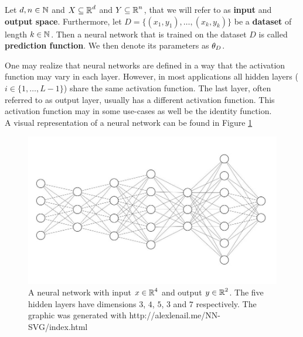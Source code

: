 \begin{definition}
Let $d, n \in \operatorname{\mathbb{N}}$ and $X\subseteq \operatorname{\mathbb{R}}^d$ and $Y \subseteq \operatorname{\mathbb{R}}^n$, that we will refer to as \textbf{input} and \textbf{output space}. Furthermore, let $D=\{(x_1,y_1),\ldots, (x_k,y_k)\}$ be a \textbf{dataset} of length $k\in\operatorname{\mathbb{N}}$. Then a neural network that is trained on the dataset $D$ is called \textbf{prediction function}. We then denote its parameters as $\theta_{D}$.
\end{definition}

One may realize that neural networks are defined in a way that the activation function may vary in each layer. However, in most applications all hidden layers ($i \in \{1, \ldots, L-1\}$) share the same activation function. The last layer, often referred to as output layer, usually has a different activation function. This activation function may in some use-cases as well be the identity function.\\
A visual representation of a neural network can be found in Figure \ref{img_nn}


\begin{figure}[H]
\begin{center}
   \begin{minipage}[b]{0.9\linewidth}
      \includegraphics[width=\linewidth]{neural_net}
      \caption{A neural network with input $x\in \operatorname{\mathbb{R}}^4$ and output $y\in\operatorname{\mathbb{R}}^2$. The five hidden layers have dimensions $3$, $4$, $5$, $3$ and $7$ respectively. The graphic was generated with http://alexlenail.me/NN-SVG/index.html}\label{img_nn}
	\end{minipage}
\end{center}
\end{figure}


